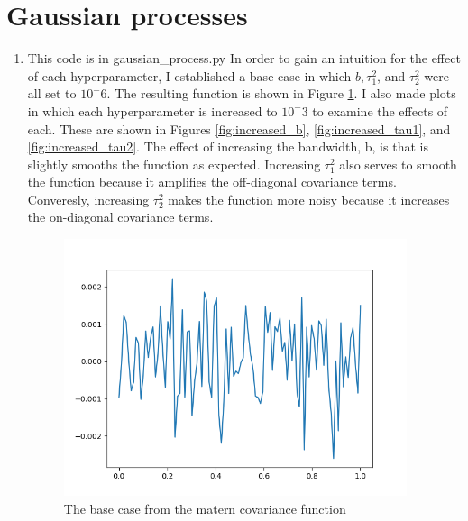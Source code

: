 \documentclass[10pt]{article}
\begin{document}
		\section{Gaussian processes}
        \begin{enumerate}[label=(\Alph*)]
        \item This code is in gaussian\_process.py
        In order to gain an intuition for the effect of each hyperparameter, I established a base case in which $b, \tau_1^2$, and $\tau_2^2$ were all set to $10^-6$. The resulting function is shown in Figure \ref{fig:base_case}. I also made plots in which each hyperparameter is increased to $10^-3$ to examine the effects of each. These are shown in Figures \ref{fig:increased_b}, \ref{fig:increased_tau1}, and \ref{fig:increased_tau2}. The effect of increasing the bandwidth, b, is that is slightly smooths the function as expected. Increasing $\tau_1^2$ also serves to smooth the function because it amplifies the off-diagonal covariance terms. Converesly, increasing $\tau_2^2$ makes the function more noisy because it increases the on-diagonal covariance terms. 
        
        
        \begin{figure}[htb] \centering
        \includegraphics[width=0.95\textwidth]{./base_case.png}
        \caption{The base case from the matern covariance function}
        \label{fig:base_case}
        \end{figure}
        

\end{enumerate}
\end{document}
